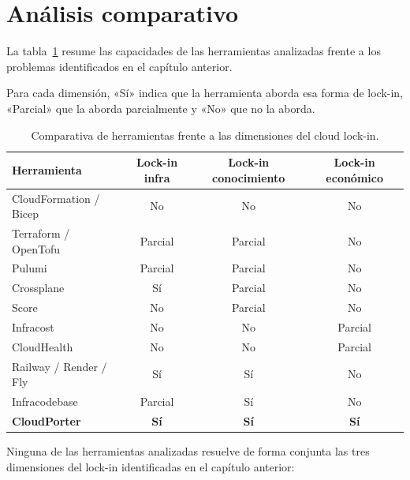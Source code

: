 \section{Análisis comparativo}

La tabla~\ref{tab:comparativa} resume las capacidades de las herramientas
analizadas frente a los problemas identificados en el capítulo anterior. 

Para cada dimensión, «Sí» indica que la herramienta aborda esa forma de lock-in, 
«Parcial» que la aborda parcialmente y «No» que no la aborda.

\begin{table}[H]
\centering
\begin{tabular}{lccc}
\hline
\textbf{Herramienta} & \textbf{Lock-in infra} & \textbf{Lock-in conocimiento} & \textbf{Lock-in económico} \\
\hline
CloudFormation / Bicep  & No      & No      & No      \\
Terraform / OpenTofu    & Parcial & Parcial & No      \\
Pulumi                  & Parcial & Parcial & No      \\
Crossplane              & Sí      & Parcial & No      \\
Score                   & No      & Parcial & No      \\
Infracost               & No      & No      & Parcial \\
CloudHealth             & No      & No      & Parcial \\
Railway / Render / Fly  & Sí      & Sí      & No      \\
Infracodebase           & Parcial & Sí      & No      \\
\textbf{CloudPorter}         & \textbf{Sí} & \textbf{Sí} & \textbf{Sí} \\
\hline
\end{tabular}
\caption{Comparativa de herramientas frente a las dimensiones del cloud lock-in.}
\label{tab:comparativa}
\end{table}

Ninguna de las herramientas analizadas resuelve de forma conjunta las tres
dimensiones del lock-in identificadas en el capítulo anterior:

